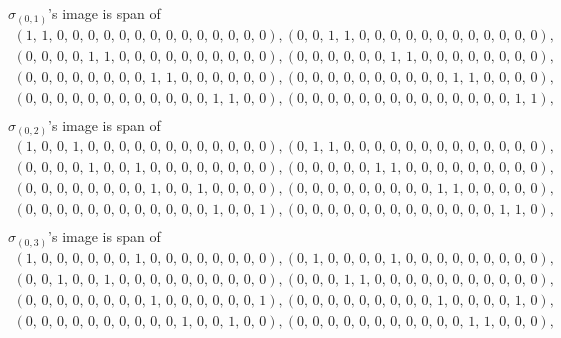 \documentclass[8pt]{article}\usepackage{amsmath}
\begin{document}
\( \sigma_{(0, 1)}\)'s image is span of   
\begin{align*} \left(1,\,1,\,0,\,0,\,0,\,0,\,0,\,0,\,0,\,0,\,0,\,0,\,0,\,0,\,0,\,0\right) , \left(0,\,0,\,1,\,1,\,0,\,0,\,0,\,0,\,0,\,0,\,0,\,0,\,0,\,0,\,0,\,0\right) , \\ 
 \left(0,\,0,\,0,\,0,\,1,\,1,\,0,\,0,\,0,\,0,\,0,\,0,\,0,\,0,\,0,\,0\right) , \left(0,\,0,\,0,\,0,\,0,\,0,\,1,\,1,\,0,\,0,\,0,\,0,\,0,\,0,\,0,\,0\right) , \\ 
 \left(0,\,0,\,0,\,0,\,0,\,0,\,0,\,0,\,1,\,1,\,0,\,0,\,0,\,0,\,0,\,0\right) , \left(0,\,0,\,0,\,0,\,0,\,0,\,0,\,0,\,0,\,0,\,1,\,1,\,0,\,0,\,0,\,0\right) , \\ 
 \left(0,\,0,\,0,\,0,\,0,\,0,\,0,\,0,\,0,\,0,\,0,\,0,\,1,\,1,\,0,\,0\right) , \left(0,\,0,\,0,\,0,\,0,\,0,\,0,\,0,\,0,\,0,\,0,\,0,\,0,\,0,\,1,\,1\right) , \\ \end{align*}
\( \sigma_{(0, 2)}\)'s image is span of   
\begin{align*} \left(1,\,0,\,0,\,1,\,0,\,0,\,0,\,0,\,0,\,0,\,0,\,0,\,0,\,0,\,0,\,0\right) , \left(0,\,1,\,1,\,0,\,0,\,0,\,0,\,0,\,0,\,0,\,0,\,0,\,0,\,0,\,0,\,0\right) , \\ 
 \left(0,\,0,\,0,\,0,\,1,\,0,\,0,\,1,\,0,\,0,\,0,\,0,\,0,\,0,\,0,\,0\right) , \left(0,\,0,\,0,\,0,\,0,\,1,\,1,\,0,\,0,\,0,\,0,\,0,\,0,\,0,\,0,\,0\right) , \\ 
 \left(0,\,0,\,0,\,0,\,0,\,0,\,0,\,0,\,1,\,0,\,0,\,1,\,0,\,0,\,0,\,0\right) , \left(0,\,0,\,0,\,0,\,0,\,0,\,0,\,0,\,0,\,1,\,1,\,0,\,0,\,0,\,0,\,0\right) , \\ 
 \left(0,\,0,\,0,\,0,\,0,\,0,\,0,\,0,\,0,\,0,\,0,\,0,\,1,\,0,\,0,\,1\right) , \left(0,\,0,\,0,\,0,\,0,\,0,\,0,\,0,\,0,\,0,\,0,\,0,\,0,\,1,\,1,\,0\right) , \\ \end{align*}
\( \sigma_{(0, 3)}\)'s image is span of   
\begin{align*} \left(1,\,0,\,0,\,0,\,0,\,0,\,0,\,1,\,0,\,0,\,0,\,0,\,0,\,0,\,0,\,0\right) , \left(0,\,1,\,0,\,0,\,0,\,0,\,1,\,0,\,0,\,0,\,0,\,0,\,0,\,0,\,0,\,0\right) , \\ 
 \left(0,\,0,\,1,\,0,\,0,\,1,\,0,\,0,\,0,\,0,\,0,\,0,\,0,\,0,\,0,\,0\right) , \left(0,\,0,\,0,\,1,\,1,\,0,\,0,\,0,\,0,\,0,\,0,\,0,\,0,\,0,\,0,\,0\right) , \\ 
 \left(0,\,0,\,0,\,0,\,0,\,0,\,0,\,0,\,1,\,0,\,0,\,0,\,0,\,0,\,0,\,1\right) , \left(0,\,0,\,0,\,0,\,0,\,0,\,0,\,0,\,0,\,1,\,0,\,0,\,0,\,0,\,1,\,0\right) , \\ 
 \left(0,\,0,\,0,\,0,\,0,\,0,\,0,\,0,\,0,\,0,\,1,\,0,\,0,\,1,\,0,\,0\right) , \left(0,\,0,\,0,\,0,\,0,\,0,\,0,\,0,\,0,\,0,\,0,\,1,\,1,\,0,\,0,\,0\right) , \\ \end{align*}
\end{document}
